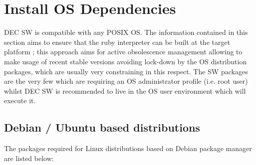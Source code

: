 \documentclass[dec_sum_main.tex]{subfiles}
\begin{document}
\section{Install OS Dependencies}
 DEC SW is compatible with any POSIX OS. The information contained in this section aims to ensure that the ruby interpreter can be built at the target platform ; this approach aims for active obsolescence management allowing to make usage of recent stable versions avoiding lock-down by the OS distribution packages, which are usually very constraining in this respect. The SW packages are the very few which are requiring an OS administrator profile (i.e. root user) whilst DEC SW is recommended to live in the OS user environment which will execute it.
 
 \subsection{Debian / Ubuntu based distributions}
 The packages required for Linux distributions based on Debian package manager are listed below:
 \par
 \noindent
   \newline
   \newline 
   \newline
   \newline
   \newline
   \newline
   \newline
   \newline
   \newline
   \newline
   \newline
   \newline
   \newline
   \newline
   \newline
   \newline
\end{document}
